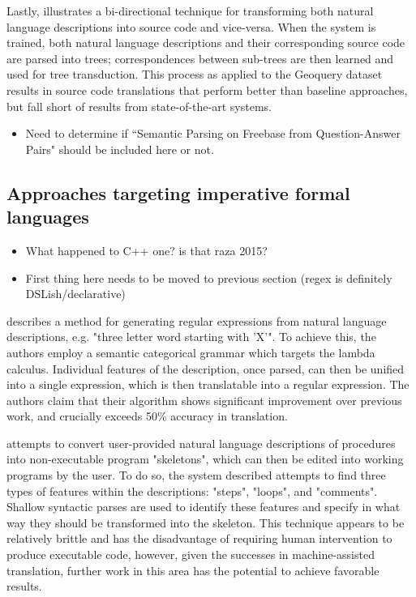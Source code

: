 \documentclass[a4paper,11pt]{proposal}
\begin{document}
Lastly, \cite{karampatsis2015} illustrates a bi-directional technique for transforming both natural language descriptions into source code and vice-versa. When the system is trained, both natural language descriptions and their corresponding source code are parsed into trees; correspondences between sub-trees are then learned and used for tree transduction. This process as applied to the Geoquery dataset results in source code translations that perform better than baseline approaches, but fall short of results from state-of-the-art systems.

\begin{itemize}
\item Need to determine if ``Semantic Parsing on Freebase from Question-Answer Pairs" \cite{berant2013} should be included here or not.
\end{itemize}


\subsection{Approaches targeting imperative formal languages}
\begin{itemize}
\item What happened to C++ one? is that raza 2015?
\item First thing here needs to be moved to previous section (regex is definitely DSLish/declarative)
\end{itemize}

\cite{kushman2013} describes a method for generating regular expressions from natural language descriptions, e.g. "three letter word starting with ’X’". To achieve this, the authors employ a semantic categorical grammar which targets the lambda calculus. Individual features of the description, once parsed, can then be unified into a single expression, which is then translatable into a regular expression. The authors claim that their algorithm shows significant improvement over previous work, and crucially exceeds 50\% accuracy in translation.

\cite{mihalcea2006} attempts to convert user-provided natural language descriptions of procedures into non-executable program "skeletons", which can then be edited into working programs by the user. To do so, the system described attempts to find three types of features within the descriptions: "steps", "loops", and "comments". Shallow syntactic parses are used to identify these features and specify in what way they should be transformed into the skeleton. This technique appears to be relatively brittle and has the disadvantage of requiring human intervention to produce executable code, however, given the successes in machine-assisted translation, further work in this area has the potential to achieve favorable results.
\end{document}
